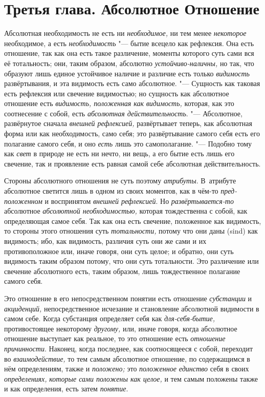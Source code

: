 \chapter[{\em Третья глава} Абсолютное Отношение]{Третья глава. Абсолютное Отношение}

Абсолютная необходимость не есть ни {\em необходимое,} ни тем менее
{\em некоторое} необходимое, а есть
{\em необходимость} "--- бытие всецело как рефлексия. Она
есть отношение, так как она есть такое различение, моменты которого суть
сами вся её тотальность; они, таким образом, абсолютно
{\em устойчиво-наличны,} но так, что образуют лишь
единое устойчивое наличие и различие есть только
{\em видимость} развёртывания, и эта видимость есть
само абсолютное. "--- Сущность как таковая есть рефлексия или свечение
видимостью; но сущность как абсолютное отношение есть
{\em видимость, положенная как
}{\em видимость,} которая, как это соотнесение с собой,
есть {\em абсолютная действительность}. "--- Абсолютное,
развёрнутое сначала {\em внешней рефлексией,}
развёртывает теперь, как абсолютная форма или как необходимость, само себя;
это развёртывание самого себя есть его полагание самого себя, и оно
{\em есть} лишь это самополагание. "--- Подобно тому как
{\em свет} в природе не есть ни нечто, ни вещь, а его
бытие есть лишь его свечение, так и проявление есть равная самой себе
абсолютная действительность.

Стороны абсолютного отношения не суть поэтому {\em атрибуты}. В~атрибуте
абсолютное светится лишь в одном из своих моментов, как в чём-то
{\em пред-положенном} и воспринятом {\em внешней рефлексией}.
Но {\em развёртывается-то} абсолютное {\em абсолютной необходимостью,} которая
тождественна с собой, как определяющая самое себя. Так как она есть свечение,
положенное как видимость, то стороны этого отношения суть {\em тотальности,}
потому что они даны (sind) как видимость; ибо, как видимость, различия суть они
же сами и их противоположное или, иначе говоря, они суть целое; и обратно, они
суть видимость таким образом потому, что они суть тотальности. Это различение
или свечение абсолютного есть, таким образом, лишь тождественное полагание
самого себя.

Это отношение в его непосредственном понятии есть отношение
{\em субстанции} и {\em акциденций,} непосредственное исчезание и
становление абсолютной видимости в самом себе. Когда субстанция определяет
себя как {\em для-себя-бытие,} противостоящее
некоторому {\em другому,} или, иначе говоря, когда
абсолютное отношение выступает как реальное, то это отношение есть
{\em отношение причинности}. Наконец, когда последнее,
как соотносящееся с собой, переходит во
{\em взаимодействие,} то тем самым абсолютное
отношение, по содержащимся в нём определениям, также и
{\em положено;} это {\em положенное
единство} себя в своих {\em определениях,}
{\em которые сами положены как целое,} и тем самым
положены также и как определения, есть затем {\em понятие}.

